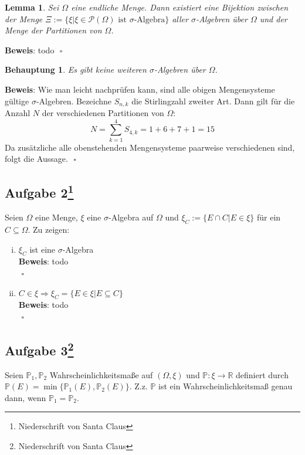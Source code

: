 \documentclass[11pt,a4paper,ngerman]{article}
\newcommand{\set}[1]{ \{ #1 \}}
\newcommand{\Prob}{\mathbb{P}}
\newtheorem{prop}{\bfseries Behauptung}
\newtheorem{lemma}{\bfseries Lemma}
\begin{document}
\begin{lemma}
Sei $\Omega$ eine endliche Menge. Dann existiert eine Bijektion zwischen der Menge $\Xi := \set{\xi | \xi \in \mathcal{P}(\Omega) \text{ ist $\sigma$-Algebra}}$ aller $\sigma$-Algebren über $\Omega$ und der Menge der Partitionen von $\Omega$.	
\end{lemma}

\textbf{Beweis}: todo $\mbox{}$ \hfill $\square$

\begin{prop}
 Es gibt keine weiteren $\sigma$-Algebren über $\Omega$. 
\end{prop}
\textbf{Beweis}: Wie man leicht nachprüfen kann, sind alle obigen Mengensysteme gültige $\sigma$-Algebren. Bezeichne $S_{n,k}$ die Stirlingzahl zweiter Art.
Dann gilt für die Anzahl $N$ der verschiedenen Partitionen von $\Omega$: 
\begin{equation}
N = \sum_{k=1}^4 S_{4,k} = 1 +6+ 7+ 1=15
\end{equation}
Da zusätzliche alle obenstehenden Mengensysteme paarweise verschiedenen sind, folgt die Aussage.
$\mbox{}$ \hfill $\square$

\subsection*{Aufgabe 2\footnote{Niederschrift von Santa Claus}}
Seien $\Omega$ eine Menge, $\xi$ eine $\sigma$-Algebra auf $\Omega$ und $\xi_C := \set{E \cap C | E \in \xi}$ für ein $C \subseteq \Omega$.
Zu zeigen:
\begin{enumerate}[(i)]
\item $\xi_C$ ist eine $\sigma$-Algebra \\
\textbf{Beweis}: todo \\
$\mbox{}$ \hfill $\square$
\item $C \in \xi \Rightarrow \xi_C = \set{E \in \xi | E \subseteq C}$ \\
\textbf{Beweis}: todo \\
$\mbox{}$ \hfill $\square$
\end{enumerate}
\subsection*{Aufgabe 3\footnote{Niederschrift von Santa Claus}}
Seien $\Prob_1, \Prob_2$ Wahrscheinlichkeitsmaße auf $(\Omega, \xi)$ und $\Prob: \xi \to \mathbb{R}$ definiert durch $\Prob(E) = \min \set{\Prob_1(E), \Prob_2(E)}$. Z.z. $\Prob$ ist ein Wahrscheinlichkeitsmaß genau dann, wenn $\Prob_1 = \Prob_2$.
\end{document}
